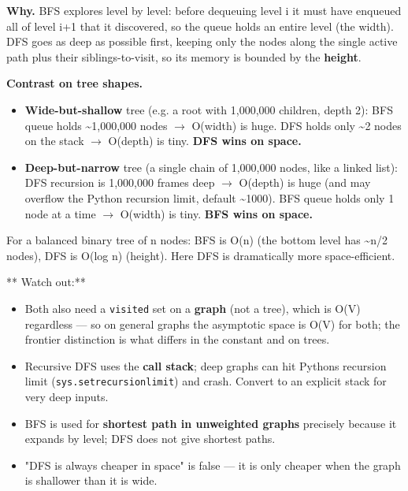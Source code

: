 \documentclass[11pt]{article}
\providecommand{\tightlist}{\setlength{\itemsep}{1pt}\setlength{\parskip}{0pt}}
\begin{document}
\textbf{Why.} BFS explores level by level: before dequeuing level i it must have enqueued all of level i+1 that it discovered, so the queue holds an entire level (the width). DFS goes as deep as possible first, keeping only the nodes along the single active path plus their siblings-to-visit, so its memory is bounded by the \textbf{height}.

\textbf{Contrast on tree shapes.}

\begin{itemize}
\tightlist
\item
  \textbf{Wide-but-shallow} tree (e.g. a root with 1,000,000 children, depth 2): BFS queue holds \textasciitilde1,000,000 nodes \(\rightarrow\) O(width) is huge. DFS holds only \textasciitilde2 nodes on the stack \(\rightarrow\) O(depth) is tiny. \textbf{DFS wins on space.}
\item
  \textbf{Deep-but-narrow} tree (a single chain of 1,000,000 nodes, like a linked list): DFS recursion is 1,000,000 frames deep \(\rightarrow\) O(depth) is huge (and may overflow the Python recursion limit, default \textasciitilde1000). BFS queue holds only 1 node at a time \(\rightarrow\) O(width) is tiny. \textbf{BFS wins on space.}
\end{itemize}

For a balanced binary tree of n nodes: BFS is O(n) (the bottom level has \textasciitilde n/2 nodes), DFS is O(log n) (height). Here DFS is dramatically more space-efficient.

** Watch out:**

\begin{itemize}
\tightlist
\item
  Both also need a \texttt{visited} set on a \textbf{graph} (not a tree), which is O(V) regardless --- so on general graphs the asymptotic space is O(V) for both; the frontier distinction is what differs in the constant and on trees.
\item
  Recursive DFS uses the \textbf{call stack}; deep graphs can hit Python\textquotesingle s recursion limit (\texttt{sys.setrecursionlimit}) and crash. Convert to an explicit stack for very deep inputs.
\item
  BFS is used for \textbf{shortest path in unweighted graphs} precisely because it expands by level; DFS does not give shortest paths.
\item
  "DFS is always cheaper in space" is false --- it is only cheaper when the graph is shallower than it is wide.
\end{itemize}
\end{document}
